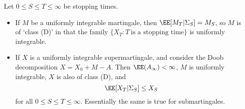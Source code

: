 \begin{theorem}
    Let $0 \leq S \leq T \leq \infty$ be stopping times.
    \begin{itemize}
        \item If $M$ be a uniformly integrable martingale, then $\EE[M_T|\Sigma_S] = M_S$, so $M$ is of `class (D)' in that the family $\{ X_T: T\ \text{is a stopping time} \}$ is uniformly integrable.

        \item If $X$ is a uniformly integrable supermartingale, and consider the Doob decomposition $X = X_0 + M - A$. Then $\EE(A_\infty) < \infty$, $M$ is uniformly integrable, $X$ is also of class (D), and
        \[ \EE[X_T|\Sigma_S] \leq X_S \]
        for all $0 \leq S \leq T \leq \infty$. Essentially the same is true for submartingales.
    \end{itemize}
\end{theorem}
